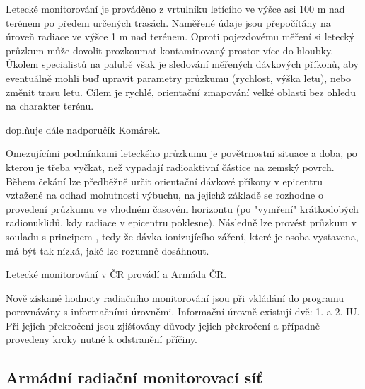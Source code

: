 \begin{itemize}
  Letecké monitorování je prováděno z vrtulníku letícího ve výšce asi
  100 m nad terénem po předem určených trasách. Naměřené údaje jsou
  přepočítány na úroveň radiace ve výšce 1 m nad terénem. Oproti
  pojezdovému měření si letecký průzkum může dovolit prozkoumat
  kontaminovaný prostor více do hloubky. Úkolem specialistů na palubě
  však je sledování měřených dávkových příkonů, aby eventuálně mohli
  buď upravit parametry průzkumu (rychlost, výška letu), nebo změnit
  trasu letu. Cílem je rychlé, orientační zmapování velké oblasti bez
  ohledu na charakter terénu.
	
   doplňuje dále nadporučík
  Komárek.
	
  Omezujícími podmínkami leteckého průzkumu je povětrnostní situace a
  doba, po kterou je třeba vyčkat, než vypadají radioaktivní částice
  na zemský povrch. Během čekání lze předběžně určit orientační
  dávkové příkony v epicentru vztažené na odhad mohutnosti výbuchu, na
  jejichž základě se rozhodne o provedení průzkumu ve vhodném časovém
  horizontu (po "vymření" krátkodobých radionuklidů, kdy radiace v
  epicentru poklesne). Následně lze provést průzkum v souladu s
  principem , tedy že dávka ionizujícího záření, které je
  osoba vystavena, má být tak nízká, jaké lze rozumně dosáhnout.
	
  Letecké monitorování v ČR provádí  a Armáda ČR.

\end{itemize}
	
Nově získané hodnoty radiačního monitorování jsou při vkládání do
programu  porovnávány s informačními úrovněmi. Informační
úrovně existují dvě: 1. a 2. IU. Při jejich překročení jsou zjišťovány
důvody jejich překročení a případně provedeny kroky nutné k odstranění
příčiny.
	
\subsection{Armádní radiační monitorovací síť}	
	
	
